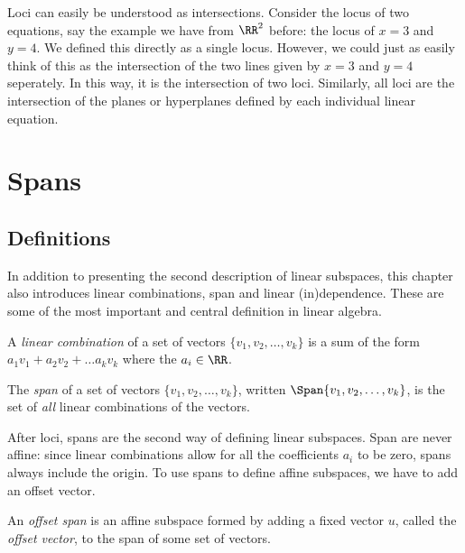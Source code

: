\documentclass[fleqn]{report}
\begin{document}
\begin{example}
Loci can easily be understood as intersections. Consider the 
locus of two equations, say the example we have from $\RR^2$
before: the locus of $x=3$ and $y=4$. We defined this directly
as a single locus. However, we could just as easily think of
this as the intersection of the two lines given by $x=3$ and
$y=4$ seperately. In this way, it is the intersection of two
loci. Similarly, all loci are the intersection of the planes or 
hyperplanes defined by each individual linear equation.
\end{example}

\section{Spans}
\label{spans}

\subsection{Definitions}
\label{span_definitions}

In addition to presenting the second description of linear
subspaces, this chapter also introduces linear combinations,
span and linear (in)dependence. These are some of the most
important and central definition in linear algebra.

\begin{defn}
A \emph{linear combination} of a set of vectors $\{v_1, v_2, \ldots,
v_k\}$ is a sum of the form $a_1 v_1 + a_2 v_2 + \ldots a_k
v_k$ where the $a_i \in \RR$. 
\end{defn}

\begin{defn}
The \emph{span} of a set of vectors $\{v_1, v_2, \ldots, v_k\}$,
written $\Span \{v_1, v_2, \ldots, v_k\}$, is the set of
\emph{all} linear combinations of the vectors.
\end{defn}

After loci, spans are the second way of defining linear
subspaces. Span are never affine: since linear combinations
allow for all the coefficients $a_i$ to be zero, spans always
include the origin. To use spans to define affine subspaces,
we have to add an offset vector.

\begin{defn}
An \emph{offset span} is an affine subspace formed by adding a
fixed vector $u$, called the \emph{offset vector}, to the
span of some set of vectors.
\end{defn}
\end{document}

